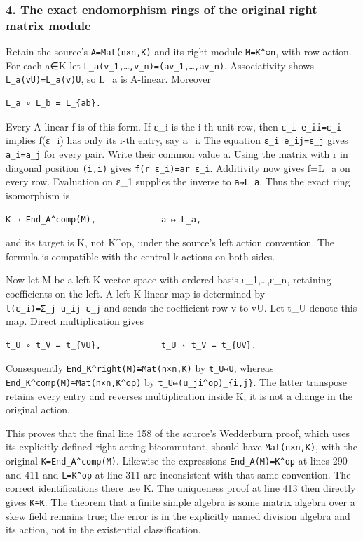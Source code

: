 \documentclass[11pt]{article}
\begin{document}
\subsubsection{4. The exact endomorphism rings of the original right matrix module}\label{the-exact-endomorphism-rings-of-the-original-right-matrix-module}

Retain the source's \texttt{A=Mat(n×n,K)} and its right module \texttt{M=K\^{}⊕n}, with row action. For each a∈K let \texttt{L\_a(v\_1,…,v\_n)=(av\_1,…,av\_n)}. Associativity shows \texttt{L\_a(vU)=L\_a(v)U}, so L\_a is A-linear. Moreover

\begin{verbatim}
L_a ∘ L_b = L_{ab}.
\end{verbatim}

Every A-linear f is of this form. If ε\_i is the i-th unit row, then \texttt{ε\_i\ e\_ii=ε\_i} implies f(ε\_i) has only its i-th entry, say a\_i. The equation \texttt{ε\_i\ e\_ij=ε\_j} gives \texttt{a\_i=a\_j} for every pair. Write their common value a. Using the matrix with r in diagonal position \texttt{(i,i)} gives \texttt{f(r\ ε\_i)=ar\ ε\_i}. Additivity now gives f=L\_a on every row. Evaluation on ε\_1 supplies the inverse to \texttt{a↦L\_a}. Thus the exact ring isomorphism is

\begin{verbatim}
K → End_A^comp(M),             a ↦ L_a,
\end{verbatim}

and its target is K, not K\^{}op, under the source's left action convention. The formula is compatible with the central k-actions on both sides.

Now let M be a left K-vector space with ordered basis ε\_1,\ldots,ε\_n, retaining coefficients on the left. A left K-linear map is determined by \texttt{t(ε\_i)=Σ\_j\ u\_ij\ ε\_j} and sends the coefficient row v to vU. Let t\_U denote this map. Direct multiplication gives

\begin{verbatim}
t_U ∘ t_V = t_{VU},            t_U ⋆ t_V = t_{UV}.
\end{verbatim}

Consequently \texttt{End\_K\^{}right(M)≅Mat(n×n,K)} by \texttt{t\_U↦U}, whereas \texttt{End\_K\^{}comp(M)≅Mat(n×n,K\^{}op)} by \texttt{t\_U↦(u\_ji\^{}op)\_\{i,j\}}. The latter transpose retains every entry and reverses multiplication inside K; it is not a change in the original action.

This proves that the final line 158 of the source's Wedderburn proof, which uses its explicitly defined right-acting bicommutant, should have \texttt{Mat(n×n,K)}, with the original \texttt{K=End\_A\^{}comp(M)}. Likewise the expressions \texttt{End\_A(M)=K\^{}op} at lines 290 and 411 and \texttt{L=K\^{}op} at line 311 are inconsistent with that same convention. The correct identifications there use K. The uniqueness proof at line 413 then directly gives \texttt{K≅K\textquotesingle{}}. The theorem that a finite simple algebra is some matrix algebra over a skew field remains true; the error is in the explicitly named division algebra and its action, not in the existential classification.
\end{document}
